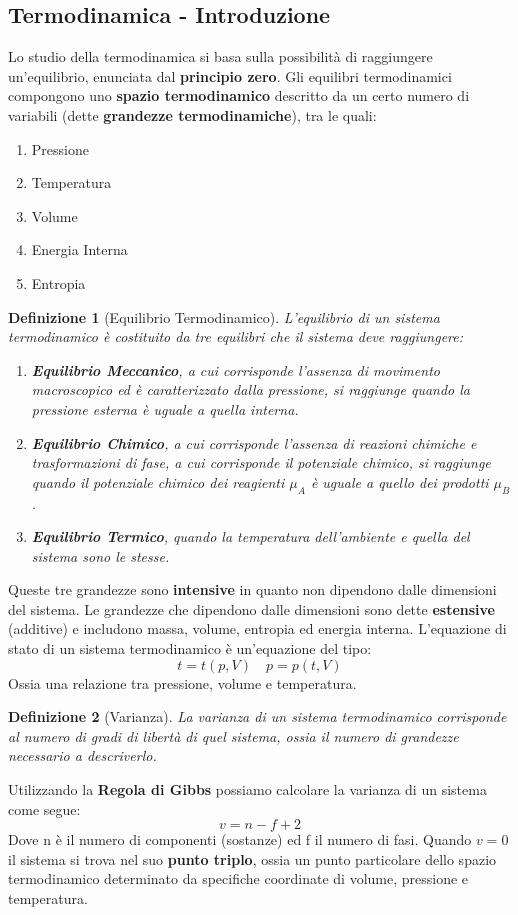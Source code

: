 \documentclass{article}
\newtheorem{defn}{Definizione}[section]
\begin{document}
\subsection{Termodinamica - Introduzione}
Lo studio della termodinamica si basa sulla possibilità di raggiungere un'equilibrio, enunciata dal \textbf{principio zero}. Gli equilibri termodinamici compongono uno \textbf{spazio termodinamico} descritto da un certo numero di variabili (dette \textbf{grandezze termodinamiche}), tra le quali:
\begin{enumerate}
    \item Pressione
    \item Temperatura
    \item Volume
    \item Energia Interna
    \item Entropia
\end{enumerate}
\begin{defn}[Equilibrio Termodinamico]
L'equilibrio di un sistema termodinamico è costituito da tre equilibri che il sistema deve raggiungere:
\begin{enumerate}
    \item \textbf{Equilibrio Meccanico}, a cui corrisponde l'assenza di movimento macroscopico ed è caratterizzato dalla pressione, si raggiunge quando la pressione esterna è uguale a quella interna.
    \item \textbf{Equilibrio Chimico}, a cui corrisponde l'assenza di reazioni chimiche e trasformazioni di fase, a cui corrisponde il potenziale chimico, si raggiunge quando il potenziale chimico dei reagienti $\mu_A$ è uguale a quello dei prodotti $\mu_B$.
    \item \textbf{Equilibrio Termico}, quando la temperatura dell'ambiente e quella del sistema sono le stesse.
\end{enumerate}
\end{defn}
Queste tre grandezze sono \textbf{intensive} in quanto non dipendono dalle dimensioni del sistema. Le grandezze che dipendono dalle dimensioni sono dette \textbf{estensive} (additive) e includono massa, volume, entropia ed energia interna.
L'equazione di stato di un sistema termodinamico è un'equazione del tipo:
\[t=t(p,V)\quad p=p(t,V)\]
Ossia una relazione tra pressione, volume e temperatura.
\begin{defn}[Varianza]
La varianza di un sistema termodinamico corrisponde al numero di gradi di libertà di quel sistema, ossia il numero di grandezze necessario a descriverlo. 
\end{defn}
Utilizzando la \textbf{Regola di Gibbs} possiamo calcolare la varianza di un sistema come segue:
\begin{equation}
    \boxed{v=n-f+2}
\end{equation}
Dove n è il numero di componenti (sostanze) ed f il numero di fasi. Quando $v=0$ il sistema si trova nel suo \textbf{punto triplo}, ossia un punto particolare dello spazio termodinamico determinato da specifiche coordinate di volume, pressione e temperatura. 
\end{document}
